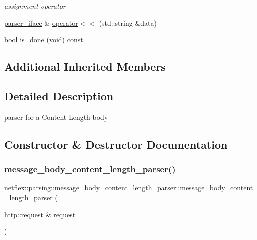 \begin{DoxyCompactItemize}
\begin{DoxyCompactList}\small\item\em assignment operator \end{DoxyCompactList}\item 
\hyperlink{classnetflex_1_1parsing_1_1parser__iface}{parser\+\_\+iface} \& \hyperlink{classnetflex_1_1parsing_1_1message__body__content__length__parser_aedd5e9afda1868496de8c69c8ef0eae2}{operator$<$$<$} (std\+::string \&data)
\item 
bool \hyperlink{classnetflex_1_1parsing_1_1message__body__content__length__parser_abe03e2f2d6f61076cf147a4bcd7f80c5}{is\+\_\+done} (void) const
\end{DoxyCompactItemize}
\subsection*{Additional Inherited Members}


\subsection{Detailed Description}
parser for a Content-\/\+Length body 

\subsection{Constructor \& Destructor Documentation}
\mbox{\label{classnetflex_1_1parsing_1_1message__body__content__length__parser_a639fe3f1644ba35c46cdcb4de6973aee}} 
\subsubsection{\texorpdfstring{message\+\_\+body\+\_\+content\+\_\+length\+\_\+parser()}{message\_body\_content\_length\_parser()}}
{\footnotesize\ttfamily netflex\+::parsing\+::message\+\_\+body\+\_\+content\+\_\+length\+\_\+parser\+::message\+\_\+body\+\_\+content\+\_\+length\+\_\+parser (\begin{DoxyParamCaption}\item[{\hyperlink{classnetflex_1_1http_1_1request}{http\+::request} \&}]{request }\end{DoxyParamCaption})\hspace{0.3cm}{\ttfamily [explicit]}}

